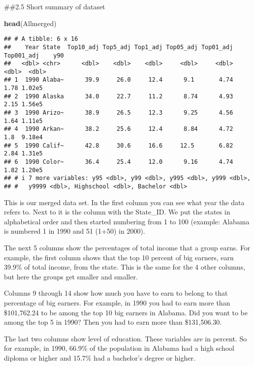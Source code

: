 \documentclass[
]{article}
\newenvironment{Shaded}{\begin{snugshade}}{\end{snugshade}}
\newcommand{\FunctionTok}[1]{\textcolor[rgb]{0.13,0.29,0.53}{\textbf{#1}}}
\newcommand{\NormalTok}[1]{#1}
\begin{document}
\#\#2.5 Short summary of dataset

\begin{Shaded}
\begin{Highlighting}[]
\FunctionTok{head}\NormalTok{(Allmerged)}
\end{Highlighting}
\end{Shaded}

\begin{verbatim}
## # A tibble: 6 x 16
##    Year State  Top10_adj Top5_adj Top1_adj Top05_adj Top01_adj Top001_adj    y90
##   <dbl> <chr>      <dbl>    <dbl>    <dbl>     <dbl>     <dbl>      <dbl>  <dbl>
## 1  1990 Alaba~      39.9     26.0     12.4      9.1       4.74       1.78 1.02e5
## 2  1990 Alaska      34.0     22.7     11.2      8.74      4.93       2.15 1.56e5
## 3  1990 Arizo~      38.9     26.5     12.3      9.25      4.56       1.64 1.11e5
## 4  1990 Arkan~      38.2     25.6     12.4      8.84      4.72       1.8  9.18e4
## 5  1990 Calif~      42.8     30.6     16.6     12.5       6.82       2.84 1.31e5
## 6  1990 Color~      36.4     25.4     12.0      9.16      4.74       1.82 1.20e5
## # i 7 more variables: y95 <dbl>, y99 <dbl>, y995 <dbl>, y999 <dbl>,
## #   y9999 <dbl>, Highschool <dbl>, Bachelor <dbl>
\end{verbatim}

This is our merged data set. In the first column you can see what year
the data refers to. Next to it is the column with the State\_ID. We put
the states in alphabetical order and then started numbering from 1 to
100 (example: Alabama is numbered 1 in 1990 and 51 (1+50) in 2000).

The next 5 columns show the percentages of total income that a group
earns. For example, the first column shows that the top 10 percent of
big earners, earn 39.9\% of total income, from the state. This is the
same for the 4 other columns, but here the groups get smaller and
smaller.

Columns 9 through 14 show how much you have to earn to belong to that
percentage of big earners. For example, in 1990 you had to earn more
than \$101,762.24 to be among the top 10 big earners in Alabama. Did you
want to be among the top 5 in 1990? Then you had to earn more than
\$131,506.30.

The last two columns show level of education. These variables are in
percent. So for example, in 1990, 66.9\% of the population in Alabama
had a high school diploma or higher and 15.7\% had a bachelor's degree
or higher.
\end{document}

